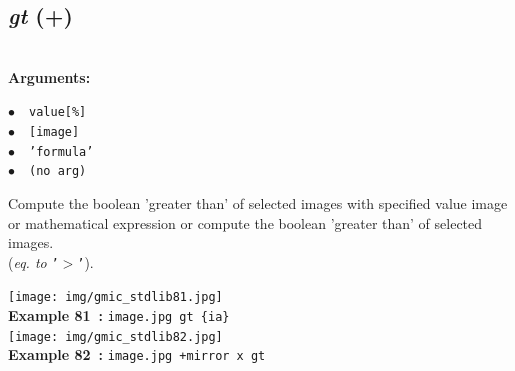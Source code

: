 \documentclass[a4paper,10.5pt,twoside]{book}
\def\comma{\discretionary{,}{}{,}}
\newcommand{\Cb}[1]{\textcolor{cb}{#1}}
\begin{document}
\subsection{\emph{gt} (+)}\vspace*{-0.7em}
~\\\textbf{\Cb{Arguments: }}\begin{flushleft}
{\small \Cb{\hspace*{0.5cm}$\bullet$~~\texttt{value[\%]}}}~~~\\
{\small \Cb{\hspace*{0.5cm}$\bullet$~~\texttt{[image]}}}~~~\\
{\small \Cb{\hspace*{0.5cm}$\bullet$~~\texttt{'formula'}}}~~~\\
{\small \Cb{\hspace*{0.5cm}$\bullet$~~\texttt{(no arg)}}}\end{flushleft}
Compute the boolean 'greater than' of selected images with specified value{\comma} image or
mathematical expression{\comma} or compute the boolean 'greater than' of selected images.
~\\(\emph{eq. to} {\small \texttt{'$>$'}}).
\begin{center}\texttt{[image: img/gmic\_stdlib81.jpg]}\\
{\footnotesize \textbf{Example 81~:} \texttt{image.jpg gt \{ia\}}}
\\\texttt{[image: img/gmic\_stdlib82.jpg]}\\
{\footnotesize \textbf{Example 82~:} \texttt{image.jpg +mirror x gt}}
\end{center}
\end{document}

